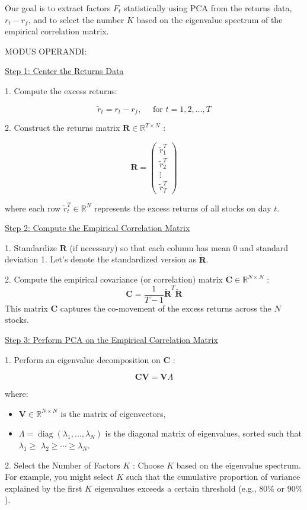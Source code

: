 \documentclass[12pt,article]{memoir}
\begin{document}
Our goal is to extract factors $F_t$ statistically using PCA from the returns data, $r_t-r_f$, and to select the number $K$ based on the eigenvalue spectrum of the empirical correlation matrix.


MODUS OPERANDI: 

\underline{Step 1: Center the Returns Data}

1. Compute the excess returns:

$$
\tilde{r}_t=r_t-r_f, \quad \text { for } t=1,2, \ldots, T
$$

2. Construct the returns matrix $\mathbf{R} \in \mathbb{R}^{T \times N}$ :

$$
\mathbf{R}=\left(\begin{array}{c}
\tilde{r}_1^T \\
\tilde{r}_2^T \\
\vdots \\
\tilde{r}_T^T
\end{array}\right)
$$

where each row $\tilde{r}_t^T \in \mathbb{R}^N$ represents the excess returns of all stocks on day $t$.


\underline{Step 2: Compute the Empirical Correlation Matrix}

1. Standardize $\mathbf{R}$ (if necessary) so that each column has mean 0 and standard deviation 1. Let's denote the standardized version as $\tilde{\mathbf{R}}$.

2. Compute the empirical covariance (or correlation) matrix $\mathbf{C} \in \mathbb{R}^{N \times N}$ :
$$
\mathbf{C}=\frac{1}{T-1} \tilde{\mathbf{R}}^T \tilde{\mathbf{R}}
$$
This matrix $\mathbf{C}$ captures the co-movement of the excess returns across the $N$ stocks.


\underline{Step 3: Perform PCA on the Empirical Correlation Matrix}

1. Perform an eigenvalue decomposition on $\mathbf{C}$ :

$$
\mathbf{C V}=\mathbf{V} \Lambda
$$

where:
\begin{itemize}
  \item $\mathbf{V} \in \mathbb{R}^{N \times N}$ is the matrix of eigenvectors,
  \item $\Lambda=\operatorname{diag}\left(\lambda_1, \ldots, \lambda_N\right)$ is the diagonal matrix of eigenvalues, sorted such that $\lambda_1 \geq$ $\lambda_2 \geq \cdots \geq \lambda_N$.
\end{itemize}

2. Select the Number of Factors $K$ : Choose $K$ based on the eigenvalue spectrum. For example, you might select $K$ such that the cumulative proportion of variance explained by the first $K$ eigenvalues exceeds a certain threshold (e.g., $80 \%$ or $90 \%$ ).
\end{document}
